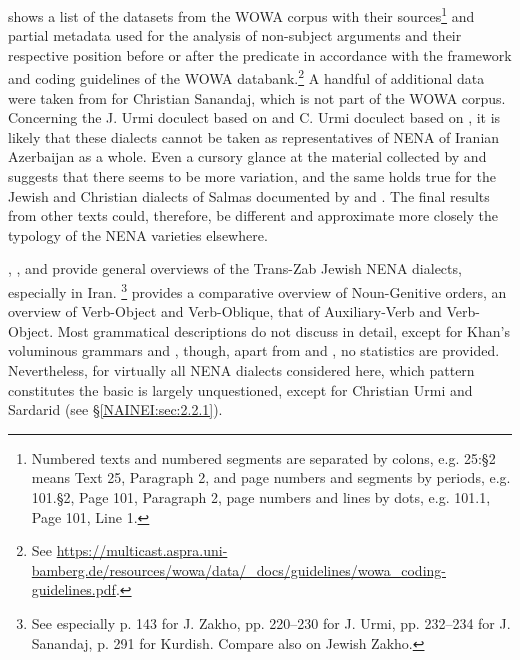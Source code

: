 \documentclass[output=paper,colorlinks,citecolor=brown,draftmode]{langscibook}
\begin{document}
 shows a list of the datasets from the WOWA corpus with their sources\footnote{Numbered texts and numbered segments are separated by colons, e.g. 25:§2 means Text 25, Paragraph 2, and page numbers and segments by periods, e.g. 101.§2, Page 101, Paragraph 2, page numbers and lines by dots, e.g. 101.1, Page 101, Line 1.}  and partial metadata used for the analysis of non-subject arguments and their respective position before or after the predicate in accordance with the framework and coding guidelines of the WOWA databank.\footnote{See \href{https://multicast.aspra.uni-bamberg.de/resources/wowa/data/_docs/guidelines/wowa_coding-guidelines.pdf}{https://multicast.aspra.uni-bamberg.de/resources/wowa/data/\_docs/guidelines/wowa\_coding-guidelines.pdf}.} A handful of additional data were taken from \citet[120--128]{Panoussi1990Senaya} for Christian Sanandaj, which is not part of the WOWA corpus. Concerning the J. Urmi doculect based on \citet{Khan2008Barwar} and C. Urmi doculect based on \citet{Khan2016CUrmi}, it is likely that these dialects cannot be taken as representatives of NENA of Iranian Azerbaijan as a whole. Even a cursory glance at the material collected by \citet{Garbell1065a} and \citet{Hopkins1989Naghada} suggests that there seems to be more variation, and the same holds true for the Jewish and Christian dialects of Salmas documented by \citet{Duval2009NASalamas} and \citet{Tsereteli1976}. The final results from other texts could, therefore, be different and approximate more closely the typology of the NENA varieties elsewhere.

\citet{Hopkins1999NAIran}, \citet{Khan2012NENA,Khan2019Anatolia,Khan2019WIran}, and \citet[100--206]{Noorlander2021Alignment} provide general overviews of the Trans-Zab Jewish NENA dialects, especially in Iran. \citet{Gutman2018AttNENA}\footnote{See especially p. 143 for J. Zakho, pp. 220–230 for J. Urmi, pp. 232–234 for J. Sanandaj, p. 291 for Kurdish. Compare also \citet{Cohen2012NENAZaxo} on Jewish Zakho.}  provides a comparative overview of Noun-Genitive orders, \citet{NoorlanderMolin2022WordOrder} an overview of Verb-Object and Verb-Oblique, \citet[398--401]{Khan2020ContactChange} that of Auxiliary-Verb and Verb-Object. Most grammatical descriptions do not discuss  in detail, except for Khan's voluminous grammars \parencite{Khan2008Barwar,Khan2016CUrmi} and \citet{Coghill2018ISNA}, though, apart from \citet{Molin2021Dohok} and \citet{NoorlanderMolin2022WordOrder}, no statistics are provided. Nevertheless, for virtually all NENA dialects considered here, which pattern constitutes the basic  is largely unquestioned, except for Christian Urmi and Sardarid (see §\ref{NAINEI:sec:2.2.1}). 
\end{document}

